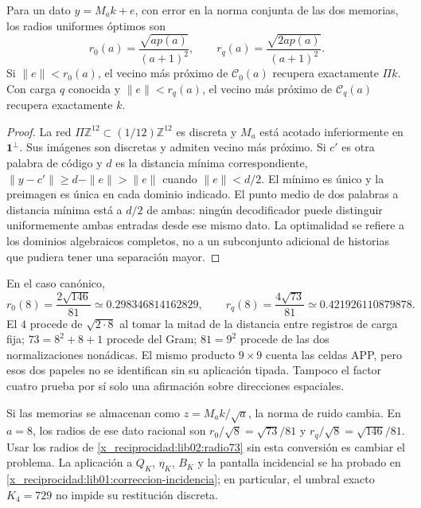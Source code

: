 \begin{theorem}
\label{x_reciprocidad:lib02:radios-memoria}
Para un dato \(y=M_ak+e\), con error en la norma conjunta de las dos
memorias, los radios uniformes óptimos son
\begin{equation}
 r_0(a)=\frac{\sqrt{ap(a)}}{(a+1)^2},\qquad
 r_q(a)=\frac{\sqrt{2ap(a)}}{(a+1)^2}.
 \label{x_reciprocidad:lib02:radios}
\end{equation}
Si \(\|e\|<r_0(a)\), el vecino más próximo de
\(\mathcal C_0(a)\) recupera exactamente \(\Pi k\). Con carga
\(q\) conocida y \(\|e\|<r_q(a)\), el vecino más próximo de
\(\mathcal C_q(a)\) recupera exactamente \(k\).
\end{theorem}
\begin{proof}
La red \(\Pi\mathbb Z^{12}\subset(1/12)\mathbb Z^{12}\) es
discreta y \(M_a\) está acotado inferiormente en
\(\mathbf1^\perp\). Sus imágenes son discretas y admiten vecino
más próximo. Si \(c'\) es otra palabra de código y \(d\) es la
distancia mínima correspondiente,
\(\|y-c'\|\geq d-\|e\|>\|e\|\) cuando \(\|e\|<d/2\).
El mínimo es único y la preimagen es única en cada dominio indicado.
El punto medio de dos palabras a distancia mínima está a \(d/2\)
de ambas: ningún decodificador puede distinguir uniformemente ambas
entradas desde ese mismo dato. La optimalidad se refiere a los dominios
algebraicos completos, no a un subconjunto adicional de historias que
pudiera tener una separación mayor.
\end{proof}

En el caso canónico,
\begin{equation}
 r_0(8)=\frac{2\sqrt{146}}{81}\simeq0.298346814162829,
 \qquad
 r_q(8)=\frac{4\sqrt{73}}{81}\simeq0.421926110879878.
 \label{x_reciprocidad:lib02:radio73}
\end{equation}
El \(4\) procede de \(\sqrt{2\cdot8}\) al tomar la mitad de la
distancia entre registros de carga fija; \(73=8^2+8+1\) procede del
Gram; \(81=9^2\) procede de las dos normalizaciones nonádicas. El mismo
producto \(9\times9\) cuenta las celdas APP, pero esos dos papeles
no se identifican sin su aplicación tipada. Tampoco el factor cuatro
prueba por sí solo una afirmación sobre direcciones espaciales.

Si las memorias se almacenan como \(z=M_ak/\sqrt a\), la norma de
ruido cambia. En \(a=8\), los radios de ese dato racional son
\(r_0/\sqrt8=\sqrt{73}/81\) y
\(r_q/\sqrt8=\sqrt{146}/81\). Usar los radios de
\eqref{x_reciprocidad:lib02:radio73} sin esta conversión es cambiar el problema.
La aplicación a \(Q_K\), \(\eta_K\), \(B_K\) y la pantalla
incidencial se ha probado en \cref{x_reciprocidad:lib01:correccion-incidencia}; en
particular, el umbral exacto \(K_4=729\) no impide su restitución
discreta.

